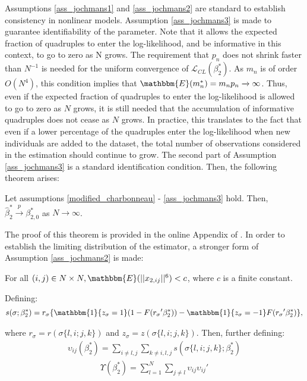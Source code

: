 Assumptions \ref{ass_jochmans1} and \ref{ass_jochmans2} are standard to establish consistency in nonlinear models. Assumption \ref{ass_jochmans3} is made to guarantee identifiability of the parameter. Note that it allows the expected fraction of quadruples to enter the log-likelihood, and be informative in this context, to go to zero as N grows. The requirement that $p_n$ does not shrink faster than $N^{-1}$ is needed for the uniform convergence of $\mathcal{L}_{CL}(\beta_2^*)$. As $m_n$ is of order $O(N^4)$, this condition implies that $\mathbbm{E}(m_n^*) = m_n p_n \xrightarrow{} \infty$. Thus, even if the expected fraction of quadruples to enter the log-likelihood is allowed to go to zero as $N$ grows, it is still needed that the accumulation of informative quadruples does not cease as $N$ grows. In practice, this translates to the fact that even if a lower percentage of the quadruples enter the log-likelihood when new individuals are added to the dataset, the total number of observations considered in the estimation should continue to grow. The second part of Assumption \ref{ass_jochmans3} is a standard identification condition. Then, the following theorem arises:

\begin{theorem}
    Let assumptions \ref{modified_charbonneau} - \ref{ass_jochmans3} hold. Then, $\hat{\beta}_2^* \xrightarrow{p} \beta_{2,0}^*$ as $N \xrightarrow{} \infty$.
\end{theorem}

The proof of this theorem is provided in the online Appendix of \cite{jochmans2018semiparametric}. In order to establish the limiting distribution of the estimator, a stronger form of Assumption \ref{ass_jochmans2} is made:

\begin{assumption}
    For all $(i,j) \in N \times N, \mathbbm{E}(\rvert \rvert x_{2,ij} \rvert \rvert^6) < c$, where $c$ is a finite constant.
\end{assumption}

Defining:
\begin{align*}
    s(\sigma; \beta_2^*) = r_\sigma \{ \mathbbm{1} \{ z_\sigma = 1\} (1 - F({r_\sigma}' \beta_2^*)) - \mathbbm{1} \{ z_\sigma = - 1\}  F({r_\sigma}' \beta_2^*)\},
\end{align*}

\noindent where $r_\sigma = r(\sigma\{l,i;j,k\})$ and $z_\sigma = z(\sigma\{l,i;j,k\})$. Then, further defining:
\begin{align*}
    \upsilon_{ij} (\beta_2^*) = \sum_{i \neq l,j} \sum_{k \neq i,l,j} s(\sigma\{l,i;j,k\}; \beta_2^*)
\end{align*}
\begin{align*}
    \Upsilon (\beta_2^*) = \sum_{l=1}^N \sum_{j \neq l}  \upsilon_{ij} \upsilon_{ij}'
\end{align*}

